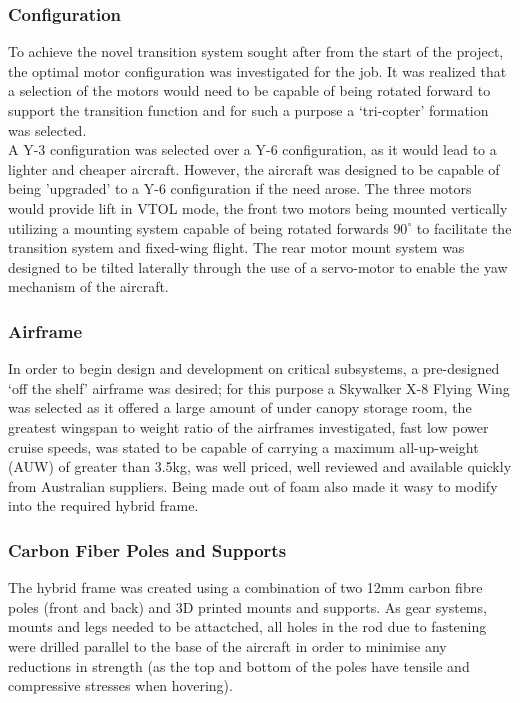 \subsubsection*{Configuration}
To achieve the novel transition system sought after from the start of the project, the optimal motor configuration was investigated for the job. It was realized that a selection of the motors would need to be capable of being rotated forward to support the transition function and for such a purpose a `tri-copter' formation was selected.\\
		
A Y-3 configuration was selected over a Y-6 configuration, as it would lead to a lighter and cheaper aircraft. However, the aircraft was designed to be capable of being 'upgraded' to a Y-6 configuration if the need arose. The three motors would provide lift in VTOL mode, the front two motors being mounted vertically utilizing a mounting system capable of being rotated forwards $90^{\circ}$ to facilitate the transition system and fixed-wing flight. The rear motor mount system was designed to be tilted laterally through the use of a servo-motor to enable the yaw mechanism of the aircraft.

\subsubsection*{Airframe}
In order to begin design and development on critical subsystems, a pre-designed `off the shelf' airframe was desired; for this purpose a Skywalker X-8 Flying Wing was selected as it offered a large amount of under canopy storage room, the greatest wingspan to weight ratio of the airframes investigated, fast low power cruise speeds, was stated to be capable of carrying a maximum all-up-weight (AUW) of greater than 3.5kg, was well priced, well reviewed and available quickly from Australian suppliers. Being made out of foam also made it wasy to modify into the required hybrid frame.
		
		
\subsubsection*{Carbon Fiber Poles and Supports}
The hybrid frame was created using a combination of two 12mm carbon fibre poles (front and back) and 3D printed mounts and supports. As gear systems, mounts and legs needed to be attactched, all holes in the rod due to fastening were drilled parallel to the base of the aircraft in order to minimise any reductions in strength (as the top and bottom of the poles have tensile and compressive stresses when hovering).
	
